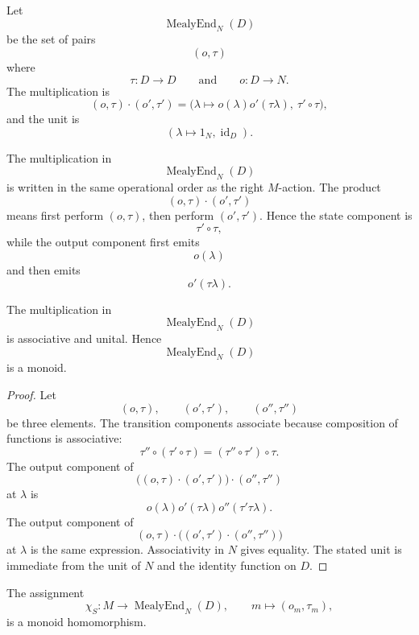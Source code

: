 \begin{definition}
\label{def:mealy-transformation-monoid}
Let
\[
\operatorname{MealyEnd}_N(D)
\]
be the set of pairs
\[
(o,\tau)
\]
where
\[
\tau:D\to D
\qquad\text{and}\qquad
o:D\to N.
\]
The multiplication is
\[
(o,\tau)\cdot(o',\tau')
=
\bigl(\lambda\mapsto o(\lambda)o'(\tau\lambda),\ \tau'\circ\tau\bigr),
\]
and the unit is
\[
(\lambda\mapsto 1_N,\operatorname{id}_D).
\]
\end{definition}

\begin{remark}
\label{rem:mealy-end-operational-order}
The multiplication in
\[
\operatorname{MealyEnd}_N(D)
\]
is written in the same operational order as the right \(M\)-action. The
product
\[
(o,\tau)\cdot(o',\tau')
\]
means first perform \((o,\tau)\), then perform \((o',\tau')\). Hence the state
component is
\[
\tau'\circ\tau,
\]
while the output component first emits
\[
o(\lambda)
\]
and then emits
\[
o'(\tau\lambda).
\]
\end{remark}

\begin{proposition}
\label{prop:mealy-transformation-monoid}
The multiplication in
\[
\operatorname{MealyEnd}_N(D)
\]
is associative and unital. Hence
\[
\operatorname{MealyEnd}_N(D)
\]
is a monoid.
\end{proposition}

\begin{proof}
Let
\[
(o,\tau),
\qquad
(o',\tau'),
\qquad
(o'',\tau'')
\]
be three elements. The transition components associate because composition of
functions is associative:
\[
\tau''\circ(\tau'\circ\tau)
=
(\tau''\circ\tau')\circ\tau.
\]
The output component of
\[
\bigl((o,\tau)\cdot(o',\tau')\bigr)\cdot(o'',\tau'')
\]
at \(\lambda\) is
\[
o(\lambda)o'(\tau\lambda)o''(\tau'\tau\lambda).
\]
The output component of
\[
(o,\tau)\cdot\bigl((o',\tau')\cdot(o'',\tau'')\bigr)
\]
at \(\lambda\) is the same expression. Associativity in \(N\) gives equality.
The stated unit is immediate from the unit of \(N\) and the identity function
on \(D\).
\end{proof}

\begin{proposition}
\label{prop:input-representation-transition-output}
The assignment
\[
\chi_S:M\to\operatorname{MealyEnd}_N(D),
\qquad
m\longmapsto(o_m,\tau_m),
\]
is a monoid homomorphism.
\end{proposition}

